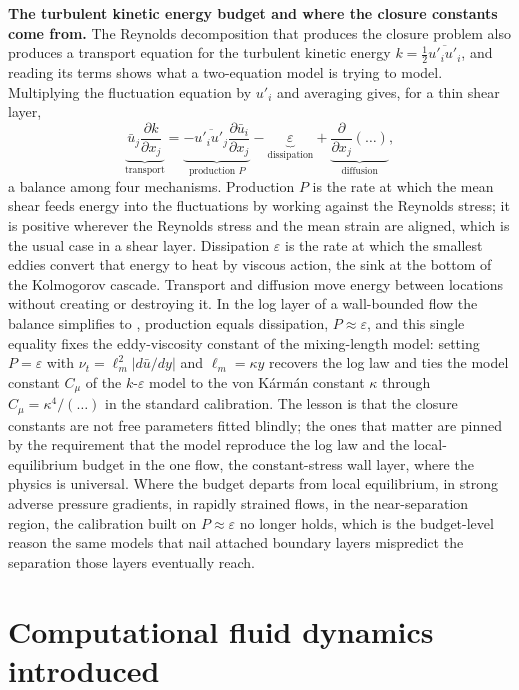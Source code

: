 \begin{mastery}
\textbf{The turbulent kinetic energy budget and where the closure
constants come from.} The Reynolds decomposition that produces the
closure problem also produces a transport equation for the turbulent
kinetic energy $k = \tfrac12\overline{u'_i u'_i}$, and reading its
terms shows what a two-equation model is trying to model. Multiplying
the fluctuation equation by $u'_i$ and averaging gives, for a thin
shear layer,
\[
\underbrace{\bar u_j\frac{\partial k}{\partial x_j}}_{\text{transport}}
= \underbrace{-\overline{u'_i u'_j}\frac{\partial\bar u_i}{\partial
x_j}}_{\text{production }P} - \underbrace{\varepsilon}_{\text{
dissipation}} + \underbrace{\frac{\partial}{\partial x_j}\!\left(
\dots\right)}_{\text{diffusion}},
\]
a balance among four mechanisms. Production $P$ is the rate at which
the mean shear feeds energy into the fluctuations by working against
the Reynolds stress; it is positive wherever the Reynolds stress and
the mean strain are aligned, which is the usual case in a shear layer.
Dissipation $\varepsilon$ is the rate at which the smallest eddies
convert that energy to heat by viscous action, the sink at the bottom
of the Kolmogorov cascade. Transport and diffusion move energy between
locations without creating or destroying it. In the log layer of a
wall-bounded flow the balance simplifies to , production equals dissipation, $P\approx\varepsilon$, and
this single equality fixes the eddy-viscosity constant of the
mixing-length model: setting $P = \varepsilon$ with $\nu_t = \ell_m^2
|d\bar u/dy|$ and $\ell_m = \kappa y$ recovers the log law and ties the
model constant $C_\mu$ of the $k$-$\varepsilon$ model to the von
K\'arm\'an constant $\kappa$ through $C_\mu = \kappa^4/(\dots)$ in the
standard calibration. The lesson is that the closure constants are not
free parameters fitted blindly; the ones that matter are pinned by the
requirement that the model reproduce the log law and the local-
equilibrium budget in the one flow, the constant-stress wall layer,
where the physics is universal. Where the budget departs from local
equilibrium, in strong adverse pressure gradients, in rapidly strained
flows, in the near-separation region, the calibration built on
$P\approx\varepsilon$ no longer holds, which is the budget-level reason
the same models that nail attached boundary layers mispredict the
separation those layers eventually reach.
\end{mastery}

\section{Computational fluid dynamics introduced}

